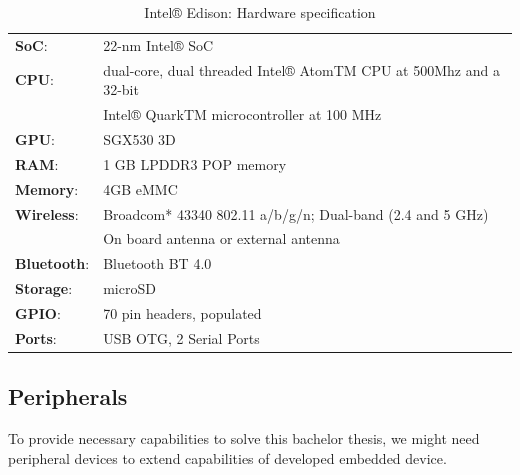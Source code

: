 \begin{table}[H]
 \begin{center}
   \begin{tabular}{l l}
   \hline
   	\textbf{SoC}: & 22-nm Intel® SoC\\
	\textbf{CPU}: & dual-core, dual threaded Intel® AtomTM CPU at 500Mhz and a 32-bit \\
   	& Intel® QuarkTM microcontroller at 100 MHz\\
	\textbf{GPU}: & SGX530 3D\\
	\textbf{RAM}: & 1 GB LPDDR3 POP memory\\
	\textbf{Memory}:& 4GB eMMC\\
	\textbf{Wireless}: & Broadcom* 43340 802.11 a/b/g/n; Dual-band (2.4 and 5 GHz)\\
	& On board antenna or external antenna \\
	\textbf{Bluetooth}: & Bluetooth BT 4.0\\
	\textbf{Storage}: & microSD\\
	\textbf{GPIO}: & 70 pin headers, populated\\
	\textbf{Ports}: & USB OTG, 2 Serial Ports\\
   \hline
   \end{tabular}
 \end{center}
 \caption{Intel® Edison: Hardware specification}
 \label{tab:tab13}
\end{table}

\subsection{Peripherals} %
\label{sub:peripherals}
To provide necessary capabilities to solve this bachelor thesis, we might need peripheral devices to extend capabilities of developed embedded device.
